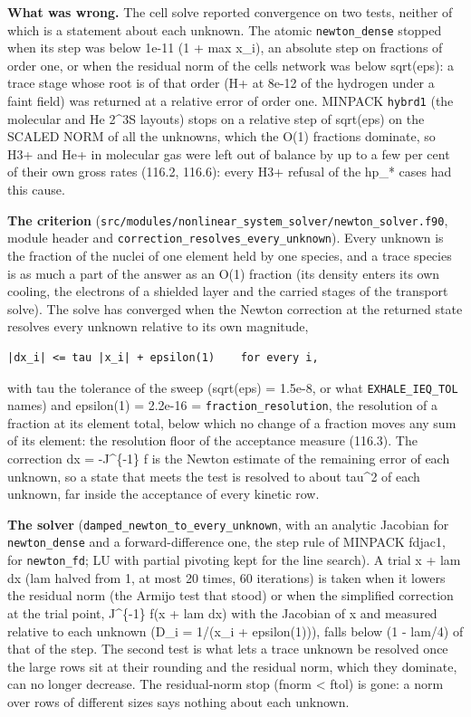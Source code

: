 \documentclass[english,a4paper]{my_memo}
\begin{document}
\textbf{What was wrong.} The cell solve reported convergence on two tests, neither
of which is a statement about each unknown. The atomic \texttt{newton\_dense} stopped
when its step was below 1e-11 (1 + max \textbar x\_i\textbar), an absolute step on fractions
of order one, or when the residual norm of the cell\textquotesingle s network was below
sqrt(eps): a trace stage whose root is of that order (H+ at 8e-12 of the
hydrogen under a faint field) was returned at a relative error of order one.
MINPACK \texttt{hybrd1} (the molecular and He 2\^{}3S layouts) stops on a relative step
of sqrt(eps) on the SCALED NORM of all the unknowns, which the O(1) fractions
dominate, so H3+ and He+ in molecular gas were left out of balance by up to a
few per cent of their own gross rates (116.2, 116.6): every H3+ refusal of
the hp\_* cases had this cause.

\textbf{The criterion} (\texttt{src/modules/nonlinear\_system\_solver/newton\_solver.f90},
module header and \texttt{correction\_resolves\_every\_unknown}). Every unknown is the
fraction of the nuclei of one element held by one species, and a trace
species is as much a part of the answer as an O(1) fraction (its density
enters its own cooling, the electrons of a shielded layer and the carried
stages of the transport solve). The solve has converged when the Newton
correction at the returned state resolves every unknown relative to its own
magnitude,

\begin{verbatim}
|dx_i| <= tau |x_i| + epsilon(1)    for every i,
\end{verbatim}

with tau the tolerance of the sweep (sqrt(eps) = 1.5e-8, or what
\texttt{EXHALE\_IEQ\_TOL} names) and epsilon(1) = 2.2e-16 = \texttt{fraction\_resolution}, the
resolution of a fraction at its element total, below which no change of a
fraction moves any sum of its element: the resolution floor of the acceptance
measure (116.3). The correction dx = -J\^{}\{-1\} f is the Newton estimate of the
remaining error of each unknown, so a state that meets the test is resolved
to about tau\^{}2 of each unknown, far inside the acceptance of every kinetic
row.

\textbf{The solver} (\texttt{damped\_newton\_to\_every\_unknown}, with an analytic Jacobian
for \texttt{newton\_dense} and a forward-difference one, the step rule of MINPACK
fdjac1, for \texttt{newton\_fd}; LU with partial pivoting kept for the line search).
A trial x + lam dx (lam halved from 1, at most 20 times, 60 iterations) is
taken when it lowers the residual norm (the Armijo test that stood) or when
the simplified correction at the trial point, J\^{}\{-1\} f(x + lam dx) with the
Jacobian of x and measured relative to each unknown (D\_i = 1/(\textbar x\_i\textbar{} +
epsilon(1))), falls below (1 - lam/4) of that of the step. The second test is
what lets a trace unknown be resolved once the large rows sit at their
rounding and the residual norm, which they dominate, can no longer decrease.
The residual-norm stop (fnorm \textless{} ftol) is gone: a norm over rows of different
sizes says nothing about each unknown.
\end{document}
